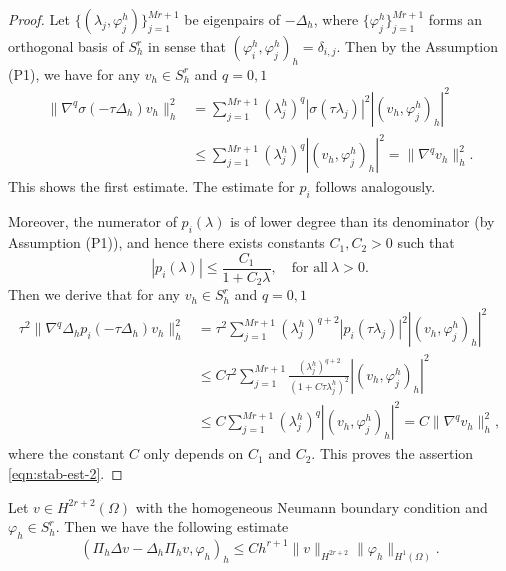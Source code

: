\documentclass[10pt,final,leqno,onefignum,onetabnum]{siamltex}%
\def\II{(\Omega)}
\def\fy{\varphi}
\begin{document}
\begin{proof}
Let $\{(\lambda_j, \fy_j^h)\}_{j=1}^{Mr+1}$ be eigenpairs of $-\Delta_h$, where $\{\fy_j^h\}_{j=1}^{Mr+1}$
forms an orthogonal basis of $S_h^r$
in sense that $ (\fy_i^h,\fy_j^h)_h = \delta_{i,j} $.
Then by the Assumption (P1),
we have for any $v_h \in S_h^r$ and $q=0,1$
\begin{align*}
 \| \nabla^q \sigma(-\tau \Delta_h) v_h \|_h^2 &=  \sum_{j=1}^{Mr+1}(\lambda_j^h)^q|\sigma(\tau\lambda_j)|^2 |(v_h , \fy_j^h)_h|^2\\
& \le \sum_{j=1}^{Mr+1} (\lambda_j^h)^q  |(v_h , \fy_j^h)_h|^2 = \| \nabla^q  v_h \|_h^2.
 \end{align*}
This shows the first estimate. The estimate for $p_i$ follows analogously.

Moreover, the numerator of $p_i(\lambda)$
is of lower degree than its denominator (by Assumption (P1)),
and hence there exists  constants $C_1, C_2>0$ such that
$$  |p_i(\lambda)| \le \frac{C_1}{1+C_2\lambda},\quad \text{for all} ~\lambda>0. $$
Then we derive that  for any $v_h \in S_h^r$ and $q=0,1$
\begin{align*}
\tau^2 \|  \nabla^q \Delta_h p_i (-\tau \Delta_h) v_h \|_h^2
&= \tau^2\sum_{j=1}^{Mr+1}(\lambda_j^h)^{q+2} |p_i(\tau\lambda_j)|^2 |(v_h , \fy_j^h)_h|^2\\
& \le C\tau^2\sum_{j=1}^{Mr+1} \frac{(\lambda_j^h)^{q+2}}{(1+C\tau\lambda_j^h)^2}  |(v_h , \fy_j^h)_h|^2 \\
& \le C \sum_{j=1}^{Mr+1} (\lambda_j^h)^q  |(v_h , \fy_j^h)_h|^2 = C\| \nabla^q  v_h \|_h^2,
\end{align*}
where the constant $C$ only depends on $C_1$ and $C_2$.
This proves the assertion \eqref{eqn:stab-est-2}.
\end{proof}


\begin{lemma}\label{lem:truncation}
Let $v\in H^{2r+2}(\Omega)$ with the homogeneous Neumann boundary condition
and $\fy_h\in S_h^r$. Then we have the following estimate
$$ (\Pi_h \Delta v - \Delta_h \Pi_h v, \fy_h )_h \le Ch^{r+1} \| v \|_{H^{2r+2}} \|\fy_h \|_{H^1\II}. $$%
\end{lemma}
\end{document}
